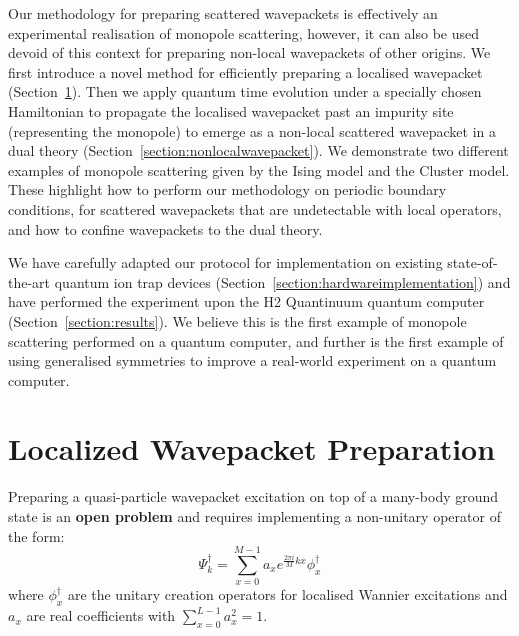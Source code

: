 \documentclass[aps,floatfix,10pt,amssymb,amsfont,amsmath,superscriptaddress,float,nofootinbib,longbibliography,nobalancelastpage,twocolumn,prx]{revtex4-2}
\begin{document}
Our methodology for preparing scattered wavepackets is effectively an experimental realisation of monopole scattering, however, it can also be used devoid of this context for preparing non-local wavepackets of other origins. We first introduce a novel method for efficiently preparing a localised wavepacket (Section~\ref{section:localized_wavepacket}). Then we apply quantum time evolution under a specially chosen Hamiltonian to propagate the localised wavepacket past an impurity site (representing the monopole) to emerge as a non-local scattered wavepacket in a dual theory (Section~\ref{section:nonlocalwavepacket}). We demonstrate two different examples of monopole scattering given by the Ising model and the Cluster model. These highlight how to perform our methodology on periodic boundary conditions, for scattered wavepackets that are undetectable with local operators, and how to confine wavepackets to the dual theory. 

We have carefully adapted our protocol for implementation on existing state-of-the-art quantum ion trap devices (Section~\ref{section:hardwareimplementation}) and have performed the experiment upon the H2 Quantinuum quantum computer (Section~\ref{section:results}). We believe this is the first example of monopole scattering performed on a quantum computer, and further is the first example of using generalised symmetries to improve a real-world experiment on a quantum computer.

\section{Localized Wavepacket Preparation}
\label{section:localized_wavepacket}
Preparing a quasi-particle wavepacket excitation on top of a many-body ground state is an \textbf{open problem} and requires implementing a non-unitary operator of the form:
\begin{equation}
    \Psi_k^{\dagger} = \sum_{x=0}^{M-1} a_xe^{\frac{2\pi i}{M}kx} \phi^{\dagger}_x
\end{equation}
where $\phi^{\dagger}_x$ are the unitary creation operators for localised Wannier excitations and $a_x$ are real coefficients with $\sum_{x=0}^{L-1} a_x^2 =1$.
\end{document}
